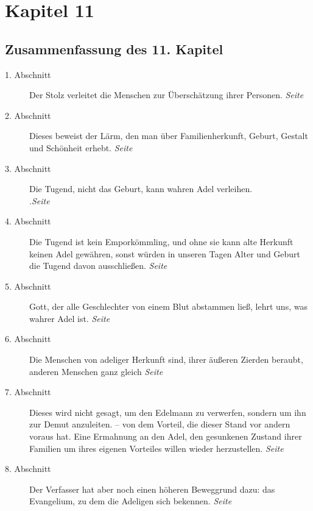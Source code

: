 
\chapter{Kapitel 11} \label{kap11}
\section{Zusammenfassung des 11. Kapitel}

\begin{description}
\item[1. Abschnitt] Der Stolz verleitet die Menschen zur Überschätzung ihrer
Personen.
\dotfill \textit{Seite~\pageref{kap11_ab1}}\\
\item[2. Abschnitt] Dieses beweist der Lärm, den man über Familienherkunft,
Geburt, Gestalt und Schönheit erhebt.
\dotfill \textit{Seite~\pageref{kap11_ab2}}\\
\item[3. Abschnitt] Die Tugend, nicht das Geburt, kann wahren Adel verleihen.\\
.\dotfill \textit{Seite~\pageref{kap11_ab3}}\\
\item[4. Abschnitt] Die Tugend ist kein Emporkömmling, und ohne sie kann alte
Herkunft keinen Adel gewähren, sonst würden in unseren Tagen Alter und Geburt
die
Tugend davon ausschließen.
\dotfill \textit{Seite~\pageref{kap11_ab4}}\\
\item[5. Abschnitt] Gott, der alle Geschlechter von einem Blut abstammen ließ,
lehrt uns, was wahrer Adel ist.
\dotfill \textit{Seite~\pageref{kap11_ab5}}\\
\item[6. Abschnitt] Die Menschen von adeliger Herkunft sind, ihrer äußeren
Zierden
beraubt, anderen Menschen ganz gleich
\dotfill \textit{Seite~\pageref{kap11_ab6}}\\
\item[7. Abschnitt] Dieses wird nicht gesagt, um den Edelmann zu verwerfen,
sondern um ihn zur Demut anzuleiten. -- von dem Vorteil, die dieser Stand vor
andern voraus hat. Eine Ermahnung an den Adel, den gesunkenen Zustand ihrer
Familien um ihres eigenen Vorteiles willen wieder herzustellen.
\dotfill \textit{Seite~\pageref{kap11_ab7}}\\
\item[8. Abschnitt] Der Verfasser hat aber noch einen höheren Beweggrund dazu:
das Evangelium, zu dem die Adeligen sich bekennen.
\dotfill \textit{Seite~\pageref{kap11_ab8}}\\

\end{description}
